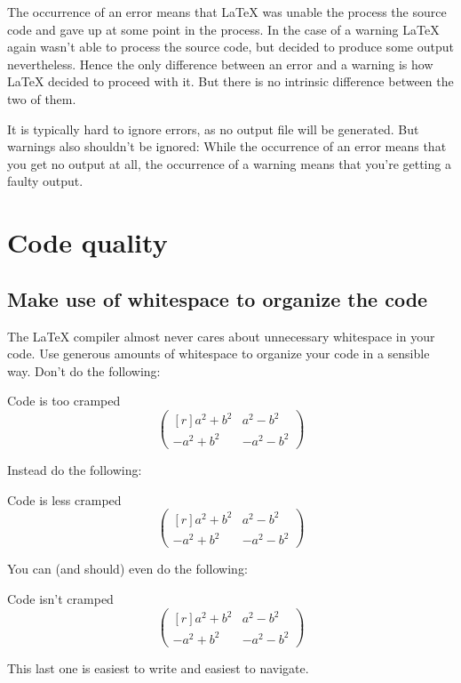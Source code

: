 The occurrence of an error means that {\LaTeX} was unable the process the source code and gave up at some point in the process.
In the case of a warning {\LaTeX} again wasn’t able to process the source code, but decided to produce some output nevertheless.
Hence the only difference between an error and a warning is how {\LaTeX} decided to proceed with it.
But there is no intrinsic difference between the two of them.

It is typically hard to ignore errors, as no output file will be generated.
But warnings also shouldn’t be ignored:
While the occurrence of an error means that you get no output at all, the occurrence of a warning means that you’re getting a faulty output.






\section{Code quality}



\subsection{Make use of whitespace to organize the code}

The {\LaTeX} compiler almost never cares about unnecessary whitespace in your code.
Use generous amounts of whitespace to organize your code in a sensible way.
Don’t do the following:
\begin{showcode}{Code is too cramped}
\[\begin{pmatrix*}[r]a^2+b^2&a^2-b^2\\-a^2+b^2&-a^2-b^2\end{pmatrix*}\]
\end{showcode}
Instead do the following:
\begin{showcode}{Code is less cramped}
\[
  \begin{pmatrix*}[r]
     a^2 + b^2 &  a^2 - b^2 \\
    -a^2 + b^2 & -a^2 - b^2
  \end{pmatrix*}
\]
\end{showcode}
You can (and should) even do the following:
\begin{showcode}{Code isn’t cramped}
\[
  \begin{pmatrix*}[r]
    a^2 + b^2
    &
    a^2 - b^2
    \\
    - a^2 + b^2
    &
    - a^2 - b^2
  \end{pmatrix*}
\]
\end{showcode}
This last one is easiest to write and easiest to navigate.

